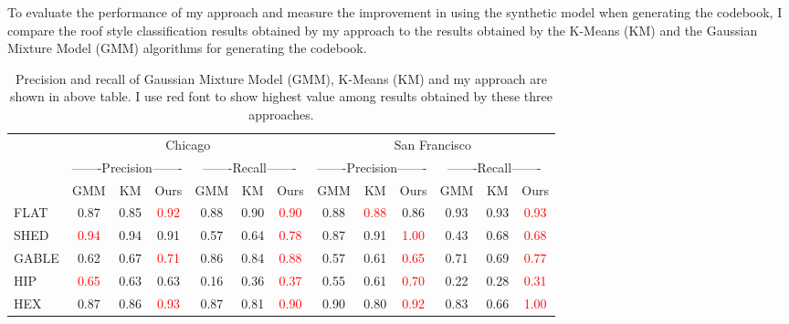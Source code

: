 \documentclass{iitthesis}
\begin{document}
To evaluate the performance of my approach and measure the improvement in using the synthetic model when generating the codebook, I compare the roof style classification results obtained by my approach to the results obtained by the K-Means (KM) and the Gaussian Mixture Model (GMM) algorithms for generating the codebook.

\begin{table}[t]
\caption{Precision and recall of Gaussian Mixture Model (GMM), K-Means (KM) and my approach are shown in above table. I use red font to show highest value among results obtained by these three approaches.}
\centering
\scalebox{0.8}
{
\begin{tabular}{ccccccccccccc}
\hline \hline
&\multicolumn{6}{c}{{Chicago}} & \multicolumn{6}{c}{{San Francisco}}\\ 


&\multicolumn{3}{c}{{-------Precision-------}} & \multicolumn{3}{c}{{-------Recall-------}} & \multicolumn{3}{c}{{-------Precision-------}} & \multicolumn{3}{c}{{-------Recall-------}}\\


&\multicolumn{1}{c}{GMM} & {KM} & {Ours} & {GMM} & {KM} & {Ours} & {GMM} & {KM} & {Ours} & {GMM} & {KM} & {Ours}\\
\hline

\multicolumn{1}{l}{{FLAT}} & 
\multicolumn{1}{c}{0.87} & 0.85 & \textcolor{red}{0.92} & 
0.88 & 0.90 & \textcolor{red}{0.90} & 
0.88 & \textcolor{red}{0.88} & 0.86 & 
0.93 & 0.93 & \textcolor{red}{0.93}\\


\multicolumn{1}{l}{{SHED}} & 
\multicolumn{1}{c}{\textcolor{red}{0.94}} & 0.94 & 0.91 & 
0.57 & 0.64 & \textcolor{red}{0.78} & 
0.87 & 0.91 & \textcolor{red}{1.00} & 
0.43 & 0.68 & \textcolor{red}{0.68}\\


\multicolumn{1}{l}{{GABLE}} & 
\multicolumn{1}{c}{0.62} & 0.67 & \textcolor{red}{0.71} & 
0.86 & 0.84 & \textcolor{red}{0.88} & 
0.57 & 0.61 & \textcolor{red}{0.65} & 
0.71 & 0.69 & \textcolor{red}{0.77}\\


\multicolumn{1}{l}{{HIP}} & 
\multicolumn{1}{c}{\textcolor{red}{0.65}} & 0.63 & 0.63 & 
0.16 & 0.36 & \textcolor{red}{0.37} & 
0.55 & 0.61 & \textcolor{red}{0.70} & 
0.22 & 0.28 & \textcolor{red}{0.31}\\


\multicolumn{1}{l}{{HEX}} & 
\multicolumn{1}{c}{0.87} & 0.86 & \textcolor{red}{0.93} & 
0.87 & 0.81 & \textcolor{red}{0.90} & 
0.90 & 0.80 & \textcolor{red}{0.92} & 
0.83 & 0.66 & \textcolor{red}{1.00}\\



\end{tabular}}
\end{table}
\end{document}
